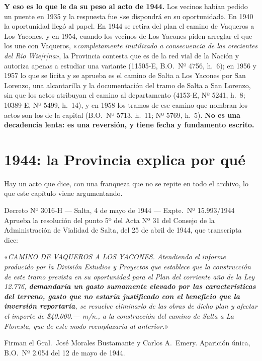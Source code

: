 \textbf{Y eso es lo que le da su peso al acto de 1944.} Los vecinos habían pedido un
puente en 1935 y la respuesta fue «se dispondrá en su oportunidad». En 1940 la oportunidad
llegó al papel. En 1944 se retira del plan el camino de Vaqueros a Los Yacones, y en 1954, cuando los vecinos de Los Yacones piden arreglar el que los une con Vaqueros, «\textit{completamente inutilizado a consecuencia de las crecientes del Río Wie[r]na}», la Provincia contesta que es de la red vial de la Nación y autoriza apenas a estudiar una variante (11505-E, B.O.\ Nº 4756, h.\ 6); en 1956 y 1957 lo que se licita y se aprueba es el camino de Salta a Los Yacones por San Lorenzo, una alcantarilla y la documentación del tramo de Salta a San Lorenzo, sin que los actos atribuyan el camino al departamento (4153-E, Nº 5241, h.\ 8; 10389-E, Nº 5499, h.\ 14), y en 1958 los tramos de ese camino que nombran los actos son los de la capital (B.O.\ Nº 5713, h.\ 11; Nº 5769, h.\ 5). \textbf{No es
una decadencia lenta: es una reversión, y tiene fecha y fundamento escrito.}

\section{1944: la Provincia explica por qué}

Hay un acto que dice, con una franqueza que no se repite en todo el archivo, lo que este
capítulo viene argumentando.

\begin{ficha}{Decreto Nº 3016-H --- Salta, 4 de mayo de 1944 --- Expte.\ Nº 15.993/1944}
Aprueba la resolución del punto 5º del Acta Nº 31 del Consejo de la Administración de Vialidad
de Salta, del 25 de abril de 1944, que transcripta dice:

«\textit{CAMINO DE VAQUEROS A LOS YACONES. Atendiendo el informe producido por la División
Estudios y Proyectos que establece que la construcción de este tramo prevista en su oportunidad
para el Plan del corriente año de la Ley 12.776, \textbf{demandaría un gasto sumamente elevado
por las características del terreno, gasto que no estaría justificado con el beneficio que la
inversión reportaría}, se resuelve eliminarlo de las obras de dicho plan y afectar el importe
de \$40.000.--- m/n., a la construcción del camino de Salta a La Floresta, que de este modo
reemplazaría al anterior.}»

Firman el Gral.\ José Morales Bustamante y Carlos A.\ Emery. Aparición única, B.O.\ Nº 2.054
del 12 de mayo de 1944.
\end{ficha}

